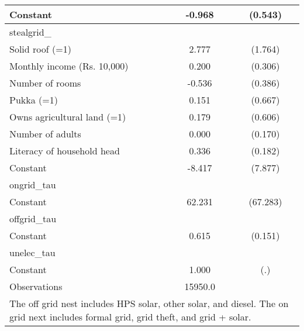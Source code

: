 \begin{table}[htbp]
\begin{tabular}{l*{1}{cc}}
Constant            &      -0.968\sym{*}  &     (0.543)\\
\midrule
stealgrid\_          &                     &            \\
Solid roof (=1)     &       2.777         &     (1.764)\\
Monthly income (Rs. 10,000)&       0.200         &     (0.306)\\
Number of rooms     &      -0.536         &     (0.386)\\
Pukka (=1)          &       0.151         &     (0.667)\\
Owns agricultural land (=1)&       0.179         &     (0.606)\\
Number of adults    &       0.000         &     (0.170)\\
Literacy of household head&       0.336\sym{*}  &     (0.182)\\
Constant            &      -8.417         &     (7.877)\\
\midrule
ongrid\_tau          &                     &            \\
Constant            &      62.231         &    (67.283)\\
\midrule
offgrid\_tau         &                     &            \\
Constant            &       0.615\sym{***}&     (0.151)\\
\midrule
unelec\_tau          &                     &            \\
Constant            &       1.000         &         (.)\\
\midrule
Observations        &     15950.0         &            \\
\bottomrule
\multicolumn{3}{l}{\footnotesize The off grid nest includes HPS solar, other solar, and diesel.                 The on grid next includes formal grid, grid theft, and grid + solar.}\\
\end{tabular}
\end{table}
